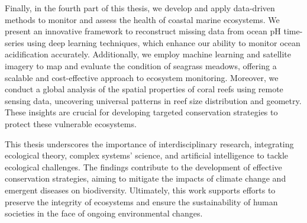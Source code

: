 Finally, in the fourth part of this thesis, we develop and apply
data-driven methods to monitor and assess the health of coastal marine
ecosystems. We present an innovative framework to reconstruct missing data
from ocean pH time-series using deep learning techniques, which enhance our
ability to monitor ocean acidification accurately. Additionally, we employ
machine learning and satellite imagery to map and evaluate the condition of
seagrass meadows, offering a scalable and cost-effective approach to
ecosystem monitoring. Moreover, we conduct a global analysis of the spatial
properties of coral reefs using remote sensing data, uncovering universal
patterns in reef size distribution and geometry. These insights are crucial
for developing targeted conservation strategies to protect these vulnerable
ecosystems.

This thesis underscores the importance of interdisciplinary research,
integrating ecological theory, complex systems' science, and artificial
intelligence to tackle ecological challenges. The findings contribute to
the development of effective conservation strategies, aiming to mitigate
the impacts of climate change and emergent diseases on biodiversity.
Ultimately, this work supports efforts to preserve the integrity of
ecosystems and ensure the sustainability of human societies in the face of
ongoing environmental changes.

\vfill